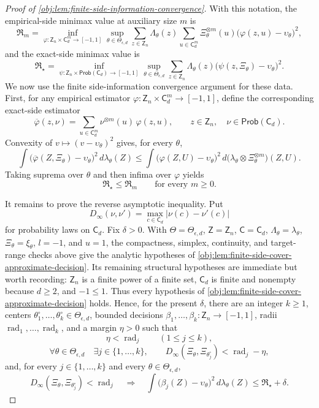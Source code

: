 \begin{proof}[Proof of \cref{obj:lem:finite-side-information-convergence}]
With this notation, the empirical-side minimax value at auxiliary size \(m\) is
\[
\mathfrak R_m
=
\inf_{\varphi:\mathsf Z_n\times\mathsf C_d^m\to[-1,1]}
\sup_{\theta\in\Theta_{\epsilon,d}}
\sum_{z\in\mathsf Z_n}\Lambda_\theta(z)
\sum_{u\in\mathsf C_d^m}\Xi_\theta^{\otimes m}(u)
\bigl(\varphi(z,u)-\upsilon_\theta\bigr)^2,
\]
and the exact-side minimax value is
\[
\mathfrak R_\star
=
\inf_{\psi:\mathsf Z_n\times\mathsf{Prob}(\mathsf C_d)\to[-1,1]}
\sup_{\theta\in\Theta_{\epsilon,d}}
\sum_{z\in\mathsf Z_n}\Lambda_\theta(z)
\bigl(\psi(z,\Xi_\theta)-\upsilon_\theta\bigr)^2 .
\]
We now use the finite side-information convergence argument for these data. First, for any
empirical estimator \(\varphi:\mathsf Z_n\times\mathsf C_d^m\to[-1,1]\), define the corresponding
exact-side estimator
\[
\overline\varphi(z,\nu)
=
\sum_{u\in\mathsf C_d^m}\nu^{\otimes m}(u)\,\varphi(z,u),
\qquad
z\in\mathsf Z_n,\quad \nu\in\mathsf{Prob}(\mathsf C_d).
\]
Convexity of \(v\mapsto(v-\upsilon_\theta)^2\) gives, for every \(\theta\),
\[
\int
\bigl(\overline\varphi(Z,\Xi_\theta)-\upsilon_\theta\bigr)^2\,d\lambda_\theta(Z)
\le
\int
\bigl(\varphi(Z,U)-\upsilon_\theta\bigr)^2\,
d\bigl(\lambda_\theta\otimes\Xi_\theta^{\otimes m}\bigr)(Z,U).
\]
Taking suprema over \(\theta\) and then infima over \(\varphi\) yields
\[
\mathfrak R_\star\le \mathfrak R_m
\qquad\text{for every }m\ge0 .
\]

It remains to prove the reverse asymptotic inequality. Put
\[
D_\infty(\nu,\nu')=\max_{c\in\mathsf C_d}|\nu(c)-\nu'(c)|
\]
for probability laws on \(\mathsf C_d\). Fix \(\delta>0\). With
\(\Theta=\Theta_{\epsilon,d}\), \(\mathsf Z=\mathsf Z_n\), \(\mathsf C=\mathsf C_d\),
\(\Lambda_\theta=\lambda_\theta\), \(\Xi_\theta=\xi_\theta\), \(l=-1\), and \(u=1\),
the compactness, simplex, continuity, and target-range checks above give the analytic hypotheses of
\cref{obj:lem:finite-side-cover-approximate-decision}. Its remaining structural hypotheses are
immediate but worth recording: \(\mathsf Z_n\) is a finite power of a finite set,
\(\mathsf C_d\) is finite and nonempty because \(d\ge2\), and \(-1\le1\). Thus every hypothesis of
\cref{obj:lem:finite-side-cover-approximate-decision} holds. Hence, for the present \(\delta\), there are
an integer \(k\ge1\), centers \(\theta^\circ_1,\ldots,\theta^\circ_k\in\Theta_{\epsilon,d}\),
bounded decisions \(\beta_1,\ldots,\beta_k:\mathsf Z_n\to[-1,1]\), radii
\(\operatorname{rad}_1,\ldots,\operatorname{rad}_k\), and a margin \(\eta>0\) such that
\[
\eta<\operatorname{rad}_j\qquad(1\le j\le k),
\]
\[
\forall\theta\in\Theta_{\epsilon,d}\quad
\exists j\in\{1,\ldots,k\},\qquad
D_\infty(\Xi_\theta,\Xi_{\theta^\circ_j})
<
\operatorname{rad}_j-\eta,
\]
and, for every \(j\in\{1,\ldots,k\}\) and every \(\theta\in\Theta_{\epsilon,d}\),
\[
D_\infty(\Xi_\theta,\Xi_{\theta^\circ_j})<\operatorname{rad}_j
\quad\Longrightarrow\quad
\int
\bigl(\beta_j(Z)-\upsilon_\theta\bigr)^2\,d\lambda_\theta(Z)
\le
\mathfrak R_\star+\delta .
\]


\end{proof}
